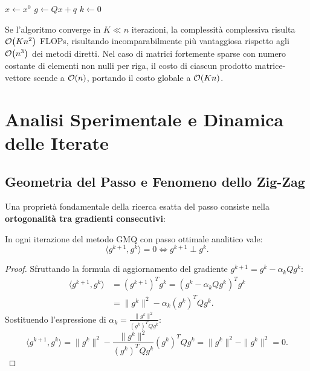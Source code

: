 \begin{algorithm}[H]
\caption{Metodo del Gradiente per Funzioni Quadratiche (GMQ Ottimizzato)}
\label{alg:gmq-ottimizzato}
$x \gets x^0$\;
$g \gets Q x + q$\;
$k \gets 0$\;
\end{algorithm}

Se l'algoritmo converge in $K \ll n$ iterazioni, la complessit\`a complessiva risulta $\mathcal{O}\!\left(K n^2\right)$ FLOPs, risultando incomparabilmente pi\`u vantaggiosa rispetto agli $\mathcal{O}\!\left(n^3\right)$ dei metodi diretti. Nel caso di matrici fortemente sparse con numero costante di elementi non nulli per riga, il costo di ciascun prodotto matrice-vettore scende a $\mathcal{O}\!\left(n\right)$, portando il costo globale a $\mathcal{O}\!\left(K n\right)$.


\FloatBarrier
\section{Analisi Sperimentale e Dinamica delle Iterate}
\label{sec:analisi-sperimentale-gmq}

\subsection{Geometria del Passo e Fenomeno dello Zig-Zag}
Una propriet\`a fondamentale della ricerca esatta del passo consiste nella \textbf{ortogonalit\`a tra gradienti consecutivi}:
\begin{proposition}
In ogni iterazione del metodo GMQ con passo ottimale analitico vale:
\begin{equation}
    \langle g^{k+1}, g^k \rangle = 0 \iff g^{k+1} \perp g^k.
\end{equation}
\end{proposition}

\begin{proof}
Sfruttando la formula di aggiornamento del gradiente $g^{k+1} = g^k - \alpha_k Q g^k$:
\begin{align}
    \langle g^{k+1}, g^k \rangle &= (g^{k+1})^T g^k = (g^k - \alpha_k Q g^k)^T g^k \nonumber \\
    &= \|g^k\|^2 - \alpha_k (g^k)^T Q g^k.
\end{align}
Sostituendo l'espressione di $\alpha_k = \frac{\|g^k\|^2}{(g^k)^T Q g^k}$:
\begin{equation}
    \langle g^{k+1}, g^k \rangle = \|g^k\|^2 - \frac{\|g^k\|^2}{(g^k)^T Q g^k} (g^k)^T Q g^k = \|g^k\|^2 - \|g^k\|^2 = 0.
\end{equation}
\end{proof}

